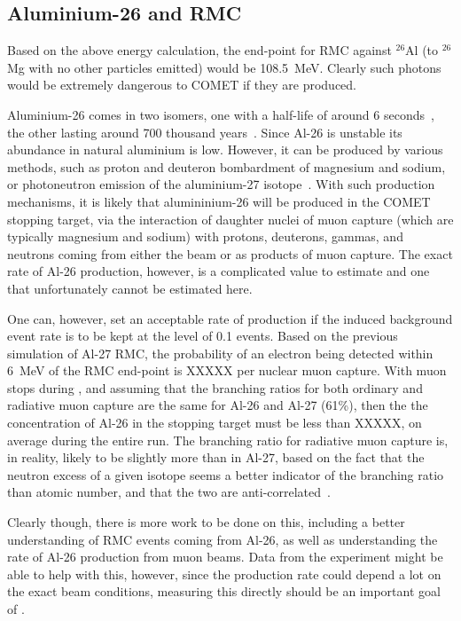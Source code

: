 \subsection{Aluminium-26 and \ac{RMC}}
Based on the above energy calculation, the end-point for \ac{RMC} against ${}^{26}$Al (to ${}^{26}$Mg with no other particles emitted) would be 108.5~MeV.
Clearly such photons would be extremely dangerous to COMET if they are produced.

Aluminium-26 comes in two isomers, one with a half-life of around 6 seconds~\cite{PhysRevLett.106.032501}, the other lasting around 700 thousand years~\cite{AUDI20033}.
Since Al-26 is unstable its abundance in natural aluminium is low.
However, it can be produced by various methods, such as proton and deuteron bombardment of magnesium and sodium, or photoneutron emission of the aluminium-27 isotope~\cite{THOMPSON1965486}.
With such production mechanisms, it is likely that alumininium-26 will be produced in the COMET stopping target, via the interaction of daughter nuclei of muon capture (which are typically magnesium and sodium)
with protons, deuterons, gammas, and neutrons coming from either the beam or as products of muon capture.
The exact rate of Al-26 production, however, is a complicated value to estimate and one that unfortunately cannot be estimated here.

One can, however, set an acceptable rate of production if the induced background event rate is to be kept at the level of 0.1 events.
Based on the previous simulation of Al-27 \ac{RMC}, the probability of an electron being detected within 6~MeV of the \ac{RMC} end-point is XXXXX per nuclear muon capture.
With \VarTotalMuStops muon stops during \phaseII, and assuming that the branching ratios for both ordinary and radiative muon capture are the same for Al-26 and Al-27 (61\%), then the 
the concentration of Al-26 in the stopping target must be less than XXXXX, on average during the entire \phaseII run.
The branching ratio for radiative muon capture is, in reality, likely to be slightly more than in Al-27, based on the fact that the neutron excess of a given isotope seems a better indicator of the branching ratio than atomic number, and that the two are anti-correlated~\cite{RevModPhys.76.31}.

Clearly though, there is more work to be done on this, including a better understanding of \ac{RMC} events coming from Al-26, as well as understanding the rate of Al-26 production from muon beams.
Data from the \alcap experiment might be able to help with this, however, since the production rate could depend a lot on the exact beam conditions, measuring this directly should be an important goal of \phaseI.

